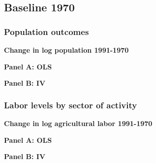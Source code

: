 \documentclass{article}
\begin{document}
\clearpage

\subsection{Baseline 1970}

\subsubsection{Population outcomes}

\begin{table}[h!]
\caption{\textbf{Change in log population 1991-1970}}
    \centering
  \begin{subtable}[t]{\linewidth}
          \caption*{\textbf{Panel A: OLS}}

    \centering
    \resizebox{\textwidth}{!}{
    \vspace{0pt}    
    
    }
    \end{subtable}
  
  \begin{subtable}[t]{\linewidth}
      \caption*{\textbf{Panel B: IV}}
    \centering
     \resizebox{\textwidth}{!}{
    \vspace{0pt}    
    
    }
    \end{subtable}
\end{table}

\clearpage

\subsubsection{Labor levels by sector of activity}

\begin{table}[h!]
\caption{\textbf{Change in log agricultural labor 1991-1970}}
    \centering
  \begin{subtable}[t]{\linewidth}
          \caption*{\textbf{Panel A: OLS}}

    \centering
    \resizebox{\textwidth}{!}{
    \vspace{0pt}    
    
    }
    \end{subtable}
  
  \begin{subtable}[t]{\linewidth}
      \caption*{\textbf{Panel B: IV}}
    \centering
     \resizebox{\textwidth}{!}{
    \vspace{0pt}    
    
    }
    \end{subtable}
\end{table}
\end{document}
